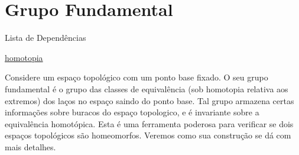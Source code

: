 \section{Grupo Fundamental}
\label{grupo-fundamental}

\begin{titlemize}{Lista de Dependências}
	\item \hyperref[Homotopia]{homotopia}\\ %
\end{titlemize}

Considere um espaço topológico com um ponto base fixado. O seu grupo fundamental é o grupo das classes de equivalência (sob homotopia relativa aos extremos) dos laços no espaço saindo do ponto base. Tal grupo armazena certas informações sobre buracos do espaço topologico, e é invariante sobre a equivalência homotópica. Esta é uma ferramenta poderosa para verificar se dois espaços topológicos são homeomorfos. %
Veremos como sua construção se dá com mais detalhes.














